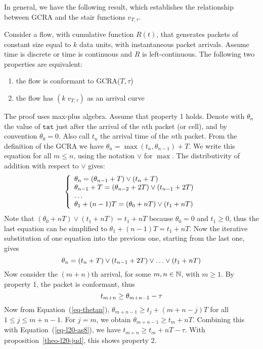 In general, we have the following result, which establishes the
relationship between GCRA and the stair functions $v_{T, \tau}$.
\begin{proposition}
Consider a flow, with cumulative function $R(t)$, that generates
packets of constant size equal to $k$ data units, with
instantaneous packet arrivals. Assume time is discrete or time is
continuous and $R$ is left-continuous. The following two
properties are equivalent:
\begin{enumerate}
    \item  the flow is conformant to GCRA($T, \tau$)
    \item  the flow has $(k \; v_{T, \tau})$ as an arrival curve
\end{enumerate}
\end{proposition}
\pr
The proof uses max-plus algebra.
Assume that property 1 holds.  Denote with $\theta_{n}$ the value
of $\texttt{tat}$ just after the arrival of the $n$th packet (or
cell), and by convention $\theta_{0}=0$.
Also call $t_{n}$ the arrival time of the $n$th packet.
From the definition of the GCRA we have $\theta_{n}= \max (t_{n},
\theta_{n-1}) + T$. We write this equation for all $m \leq n$, using
the notation $\vee$ for $\max$. The distributivity of addition with
respect to $\vee$ gives:
$$
\left\{\begin{array}{l} 
  \theta_{n} = (\theta_{n-1}+T) \vee (t_{n}+T) \\
  \theta_{n-1}+T = (\theta_{n-2}+2T) \vee (t_{n-1}+2T) \\
  \ldots \\
  \theta_{1}+(n-1)T = (\theta_{0}+nT) \vee (t_{1}+nT)
   \end{array} \right.
$$ Note that $(\theta_{0}+nT) \vee (t_{1}+nT) = t_{1}+nT$ because
$\theta_{0}=0$ and $t_{1} \geq 0$, thus the last equation can be
simplified to $\theta_{1}+(n-1)T =t_{1}+nT$. Now the iterative
substitution of one equation into the previous one, starting from
the last one, gives
\begin{equation} \mylabel{eq-thetan}
    \theta_{n} = (t_{n}+T) \vee (t_{n-1}+2T) \vee \ldots \vee (t_{1}+nT)
\end{equation}
Now consider the $(m+n)$th arrival, for some $m, n \in \mathbb{N}$, with
$m\geq 1$. By
property 1, the packet is conformant, thus
 \begin{equation} \mylabel{eq-l20-as8}
    t_{m+n} \geq \theta_{m+n-1} -\tau
 \end{equation}
Now from Equation~(\ref{eq-thetan}), $\theta_{m+n-1} \geq
t_{j}+(m+n-j)T$ for all $1 \leq j\leq m+n-1$. For $j=m$, we obtain
$\theta_{m+n-1}\geq t_{m}+ nT$. Combining this with
Equation~(\ref{eq-l20-as8}), we have $t_{m+n} \geq t_{m} + nT -
\tau$. With proposition~\ref{theo-l20-jud}, this shows property 2.

